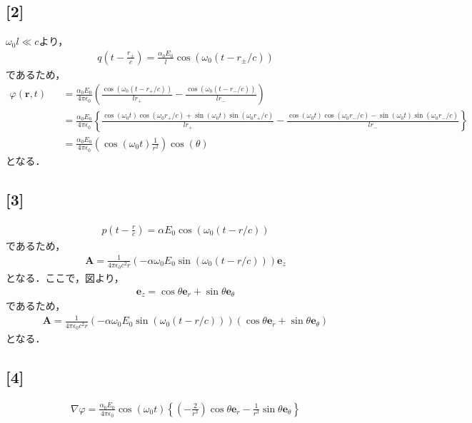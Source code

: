 \documentclass[12pt,dvipdfmx]{jsarticle}
\begin{document}
\subsection*{\large{[2]}}
$\omega_0 l\ll c$より，
\begin{eqnarray}
  q\left( t-\frac{r_{\pm}}{c} \right) = \frac{\alpha_0 E_0}{l}\cos\left( \omega_0 ( t- r_{\pm}/c ) \right)
\end{eqnarray}
であるため，
\begin{eqnarray*}
  \varphi(\bm{r},t) &&=\frac{\alpha_0 E_0}{4\pi\epsilon_0}\left( \frac{\cos\left( \omega_0 ( t- r_{+}/c ) \right)}{lr_+} - \frac{\cos\left( \omega_0 ( t- r_{-}/c ) \right)}{lr_-} \right)\\
  &&= \frac{\alpha_0 E_0}{4\pi\epsilon_0}\left\{ \frac{\cos(\omega_0 t)\cos(\omega_0 r_+/c)+\sin(\omega_0 t)\sin(\omega_0 r_+/c)}{lr_+}- \frac{\cos(\omega_0 t)\cos(\omega_0 r_-/c)-\sin(\omega_0 t)\sin(\omega_0 r_-/c)}{lr_-} \right\}\\
  &&= \frac{\alpha_0 E_0}{4\pi\epsilon_0}\left( \cos(\omega_0 t)\frac{1}{r^2} \right)\cos(\theta)
\end{eqnarray*}
となる．
\subsection*{\large{[3]}}
\begin{eqnarray}
  p \left( t -\frac{r}{c} \right) = \alpha E_0 \cos\left( \omega_0 ( t-r/c ) \right)
\end{eqnarray}
であるため，
\begin{eqnarray}
  \bm{A} = \frac{1}{4\pi\epsilon_0 c^2 r}\left( -\alpha \omega_0 E_0\sin\left( \omega_0 ( t-r/c ) \right) \right)\bm{e}_z
\end{eqnarray}
となる．ここで，図より，
\begin{eqnarray}
  \bm{e}_z = \cos\theta \bm{e}_r + \sin\theta \bm{e}_\theta
\end{eqnarray}
であるため，
\begin{eqnarray}
  \bm{A}=\frac{1}{4\pi\epsilon_0 c^2 r}\left( -\alpha \omega_0 E_0\sin\left( \omega_0 ( t-r/c ) \right) \right) \left( \cos\theta \bm{e}_r + \sin\theta \bm{e}_\theta \right)
\end{eqnarray}
となる．
\subsection*{\large{[4]}}
\begin{eqnarray}
  \nabla \varphi = \frac{\alpha_0 E_0}{4\pi\epsilon_0}\cos(\omega_0 t) \left\{ \left( -\frac{2}{r^3} \right)\cos\theta \bm{e}_r - \frac{1}{r^3}\sin\theta \bm{e}_\theta \right\}
\end{eqnarray}
\end{document}
